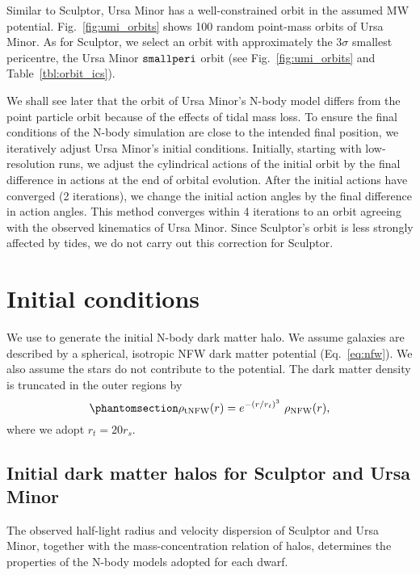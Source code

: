 Similar to Sculptor, Ursa Minor has a well-constrained orbit in the
assumed MW potential. Fig.~\ref{fig:umi_orbits} shows 100 random
point-mass orbits of Ursa Minor. As for Sculptor, we select an orbit
with approximately the \(3\sigma\) smallest pericentre, the Ursa Minor
\({\tt smallperi}{}\) orbit (see Fig.~\ref{fig:umi_orbits} and
Table~\ref{tbl:orbit_ics}).

We shall see later that the orbit of Ursa Minor's N-body model differs
from the point particle orbit because of the effects of tidal mass loss.
To ensure the final conditions of the N-body simulation are close to the
intended final position, we iteratively adjust Ursa Minor's initial
conditions. Initially, starting with low-resolution runs, we adjust the
cylindrical actions of the initial orbit by the final difference in
actions at the end of orbital evolution. After the initial actions have
converged (2 iterations), we change the initial action angles by the
final difference in action angles. This method converges within 4
iterations to an orbit agreeing with the observed kinematics of Ursa
Minor. Since Sculptor's orbit is less strongly affected by tides, we do
not carry out this correction for Sculptor.

\section{Initial conditions}\label{initial-conditions}

We use \agama{} \citep{agama} to generate the initial N-body dark matter
halo. We assume galaxies are described by a spherical, isotropic NFW
dark matter potential (Eq.~\ref{eq:nfw}). We also assume the stars do
not contribute to the potential. The dark matter density is truncated in
the outer regions by
\begin{equation}\protect\phantomsection\label{eq:trunc_nfw}{
\rho_{\rm tNFW}(r) = e^{-(r/r_t)^3}\ \rho_{\rm NFW}(r),
}\end{equation} where we adopt \(r_t = 20 r_s\).

\subsection{Initial dark matter halos for Sculptor and Ursa
Minor}\label{initial-dark-matter-halos-for-sculptor-and-ursa-minor}

The observed half-light radius and velocity dispersion of Sculptor and
Ursa Minor, together with the mass-concentration relation of \LCDM{}
halos, determines the properties of the N-body models adopted for each
dwarf.

